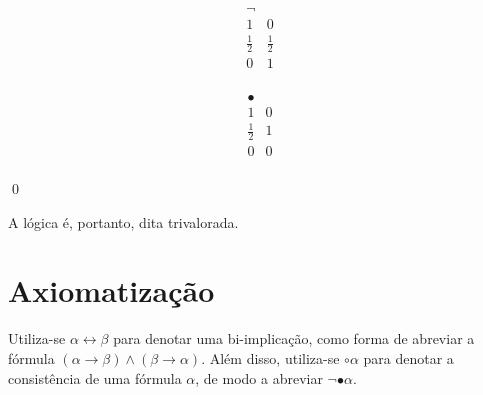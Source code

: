 \begin{definicao}
    \begin{minipage}{0.5\textwidth}
        \[
            \begin{array}{c|c}
                \neg        &             \\
                \hline
                1           & 0           \\
                \frac{1}{2} & \frac{1}{2} \\
                0           & 1           \\
            \end{array}
        \]
    \end{minipage}
    \begin{minipage}{0.3\textwidth}
        \[
            \begin{array}{c|c}
                \bullet       &   \\
                \hline
                1           & 0 \\
                \frac{1}{2} & 1 \\
                0           & 0 \\
            \end{array}
        \]
    \end{minipage}

    \noindent
    \qed{}
\end{definicao}

A lógica \lfium{} é, portanto, dita trivalorada.


\section{Axiomatização}

\begin{notacao}
    Utiliza-se $\alpha \leftrightarrow \beta$ para denotar uma bi-implicação, como forma de abreviar a fórmula $(\alpha \rightarrow \beta) \land (\beta \rightarrow \alpha)$. Além disso, utiliza-se $\circ \alpha$ para denotar a consistência de uma fórmula $\alpha$, de modo a abreviar $\neg \bullet \alpha$.
\end{notacao}

